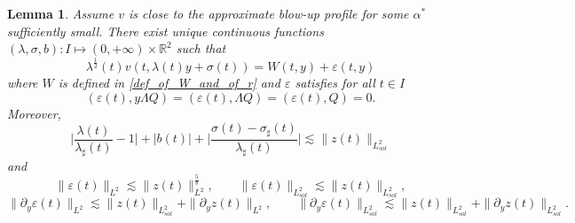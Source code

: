 \documentclass[16pt,english, oneside,reqno]{smfart}
\newcommand{\RR}{\mathbb{R}}
\newcommand{\vare}{{\varepsilon}}
\newtheorem{lemma}[theorem]{Lemma}
\begin{document}
\begin{lemma}\label{lemma_on_decomposition_around_Q}
    Assume $v$ is close to the approximate blow-up profile for some $\alpha^{*}$ sufficiently small. There exist unique continuous functions $(\lambda,\sigma,b):I\mapsto (0,+\infty) \times \RR^2$ such that
    \begin{equation}\label{decomposition_of_v_in_lemma}
        \lambda^{\frac{1}{2}}(t)v(t, \lambda(t)y+\sigma(t)) = W(t,y)+ \vare(t,y)
    \end{equation}
    where $W$ is defined in \eqref{def_of_W_and_of_r} and  $\vare$ satisfies for all $t\in I$
    \begin{equation}\label{orthogonal_conditions_in_lemma}
        (\vare(t),y\Lambda Q ) = (\vare(t),\Lambda Q) = (\vare(t), Q) = 0.
    \end{equation}
    Moreover,
    \begin{equation}
        \bigg\lvert \frac{\lambda(t)}{\lambda_{\sharp}(t)} - 1\bigg\rvert + |b(t)| + \bigg\lvert \frac{\sigma(t)-\sigma_{\sharp}(t)}{\lambda_{\sharp}(t)} \bigg\rvert \lesssim \|z(t)\|_{L^2_{sol}}
    \end{equation}
    and
    \begin{equation}\label{estimates_on_norms_of_vares_in_z_in_decomp}
        \|\vare(t)\|_{L^2} \lesssim \|z(t)\|^{\frac 58}_{L^2}, \qquad \|\vare(t)\|_{L^2_{sol}} \lesssim \|z(t)\|_{L^2_{sol}},
    \end{equation}
    \begin{equation}\label{estimates_on_norms_of_partial_vares_in_z_in_decomp}
        \|\partial_y \vare(t)\|_{L^2} \lesssim \|z(t)\|_{L^2_{sol}} + \|\partial_y z(t)\|_{L^2},  \qquad \|\partial_y \vare(t)\|_{L^2_{sol}} \lesssim \|z(t)\|_{L^2_{sol}}+\|\partial_y z(t)\|_{L^2_{sol}}.
    \end{equation}
\end{lemma}  
\end{document}
